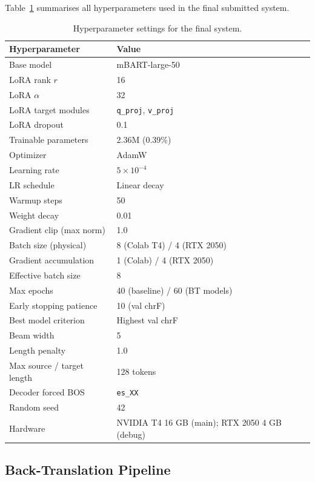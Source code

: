 \documentclass[sigconf,screen]{ceurart}
\begin{document}
Table~\ref{tab:hyperparams} summarises all hyperparameters used in
the final submitted system.

\begin{table}[h]
\centering
\caption{Hyperparameter settings for the final system.}
\label{tab:hyperparams}
\begin{tabular}{ll}
\toprule
\textbf{Hyperparameter} & \textbf{Value} \\
\midrule
Base model & mBART-large-50 \\
LoRA rank $r$ & 16 \\
LoRA $\alpha$ & 32 \\
LoRA target modules & \texttt{q\_proj}, \texttt{v\_proj} \\
LoRA dropout & 0.1 \\
Trainable parameters & 2.36M (0.39\%) \\
\midrule
Optimizer & AdamW \\
Learning rate & $5 \times 10^{-4}$ \\
LR schedule & Linear decay \\
Warmup steps & 50 \\
Weight decay & 0.01 \\
Gradient clip (max norm) & 1.0 \\
\midrule
Batch size (physical) & 8 (Colab T4) / 4 (RTX 2050) \\
Gradient accumulation & 1 (Colab) / 4 (RTX 2050) \\
Effective batch size & 8 \\
Max epochs & 40 (baseline) / 60 (BT models) \\
Early stopping patience & 10 (val chrF) \\
Best model criterion & Highest val chrF \\
\midrule
Beam width & 5 \\
Length penalty & 1.0 \\
Max source / target length & 128 tokens \\
Decoder forced BOS & \texttt{es\_XX} \\
\midrule
Random seed & 42 \\
Hardware & NVIDIA T4 16 GB (main); RTX 2050 4 GB (debug) \\
\bottomrule
\end{tabular}
\end{table}

\subsection{Back-Translation Pipeline}
\label{sec:btpipeline}
\end{document}
